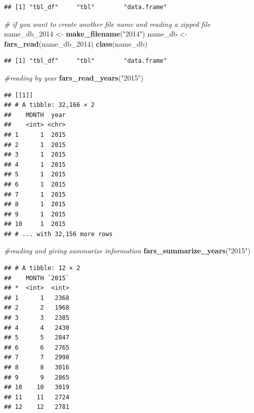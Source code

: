\documentclass[]{article}
\newenvironment{Shaded}{\begin{snugshade}}{\end{snugshade}}
\newcommand{\KeywordTok}[1]{\textcolor[rgb]{0.13,0.29,0.53}{\textbf{{#1}}}}
\newcommand{\StringTok}[1]{\textcolor[rgb]{0.31,0.60,0.02}{{#1}}}
\newcommand{\CommentTok}[1]{\textcolor[rgb]{0.56,0.35,0.01}{\textit{{#1}}}}
\newcommand{\NormalTok}[1]{{#1}}
\begin{document}
\begin{verbatim}
## [1] "tbl_df"     "tbl"        "data.frame"
\end{verbatim}

\begin{Shaded}
\begin{Highlighting}[]
\CommentTok{# if you want to create another file name and reading a zipped file}
\NormalTok{name_db_2014 <-}\StringTok{ }\KeywordTok{make_filename}\NormalTok{(}\StringTok{"2014"}\NormalTok{)}
\NormalTok{name_db <-}\StringTok{ }\KeywordTok{fars_read}\NormalTok{(name_db_2014)}
\KeywordTok{class}\NormalTok{(name_db)}
\end{Highlighting}
\end{Shaded}

\begin{verbatim}
## [1] "tbl_df"     "tbl"        "data.frame"
\end{verbatim}

\begin{Shaded}
\begin{Highlighting}[]
\CommentTok{#reading by year}
\KeywordTok{fars_read_years}\NormalTok{(}\StringTok{"2015"}\NormalTok{)}
\end{Highlighting}
\end{Shaded}

\begin{verbatim}
## [[1]]
## # A tibble: 32,166 × 2
##    MONTH  year
##    <int> <chr>
## 1      1  2015
## 2      1  2015
## 3      1  2015
## 4      1  2015
## 5      1  2015
## 6      1  2015
## 7      1  2015
## 8      1  2015
## 9      1  2015
## 10     1  2015
## # ... with 32,156 more rows
\end{verbatim}

\begin{Shaded}
\begin{Highlighting}[]
\CommentTok{#reading and giving summarize information}
\KeywordTok{fars_summarize_years}\NormalTok{(}\StringTok{"2015"}\NormalTok{)}
\end{Highlighting}
\end{Shaded}

\begin{verbatim}
## # A tibble: 12 × 2
##    MONTH `2015`
## *  <int>  <int>
## 1      1   2368
## 2      2   1968
## 3      3   2385
## 4      4   2430
## 5      5   2847
## 6      6   2765
## 7      7   2998
## 8      8   3016
## 9      9   2865
## 10    10   3019
## 11    11   2724
## 12    12   2781
\end{verbatim}
\end{document}
